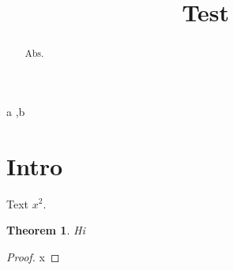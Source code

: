 \documentclass[a4paper,fleqn,doubleblind]{cas-dc}
\newtheorem{theorem}{Theorem}
\begin{document}
\title[mode=title]{Test}
\begin{abstract}Abs.\end{abstract}
\begin{keywords}a \sep b\end{keywords}
\maketitle
\section{Intro}
Text $x^2$.\begin{theorem}Hi\end{theorem}\begin{proof}x\end{proof}
\end{document}
